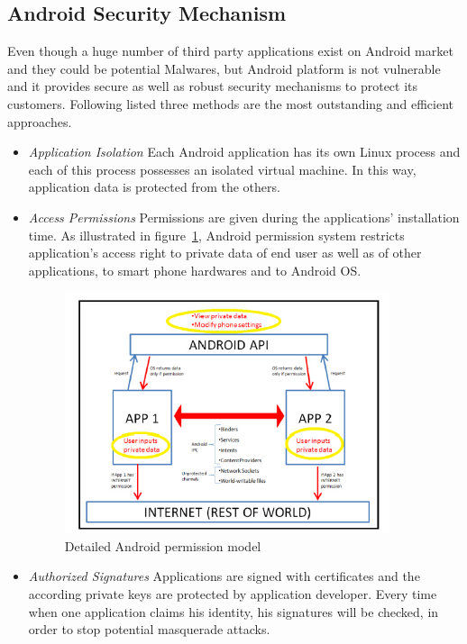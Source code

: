\subsection{Android Security Mechanism}
Even though a huge number of third party applications exist on Android market and they could be potential Malwares, but Android platform is not vulnerable and it provides secure as well as robust security mechanisms to protect its customers. Following listed three methods are the most outstanding and efficient approaches.
\begin{itemize}
\item \emph{Application Isolation} Each Android application has its own Linux process and each of this process possesses an isolated virtual machine. In this way,  application data is protected from the others\cite{android_secure_language}. 
\item \emph{Access Permissions} Permissions are given during the applications' installation time. As illustrated in figure~\ref{fig:android-permission}, Android permission system restricts application's access right to private data of end user as well as of other applications, to smart phone hardwares and to Android OS. 
\begin{figure}[!htb]
	\centering
	\includegraphics[width=0.9\textwidth]{android-permission.jpg}
		\caption{Detailed Android permission model\cite{android_secure_design}}
	\label{fig:android-permission}
\end{figure}
\item \emph{Authorized Signatures} Applications are signed with certificates and the according private keys are protected by application developer. Every time when one application claims his identity, his signatures will be checked, in order to stop potential masquerade attacks\cite{android_secure_language}.
\end{itemize}

